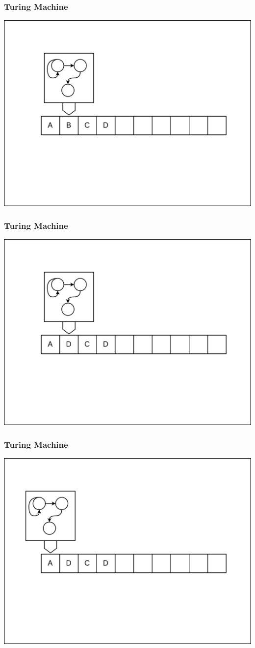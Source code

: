 \documentclass[aspectratio=169]{beamer}
\begin{document}
\begin{frame}
  \frametitle{Turing Machine}
  \begin{center}
    \includegraphics[width=.75\textwidth]{frame2.png}
  \end{center}
\end{frame}

\begin{frame}
  \frametitle{Turing Machine}
  \begin{center}
    \includegraphics[width=.75\textwidth]{frame3.png}
  \end{center}
\end{frame}

\begin{frame}
  \frametitle{Turing Machine}
  \begin{center}
    \includegraphics[width=.75\textwidth]{frame4.png}
  \end{center}
\end{frame}
\end{document}
